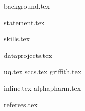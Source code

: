 \documentclass[hidelinks, 12pt]{article}
\begin{document}
{background.tex}

\vspace{1mm}
{statement.tex}

\vspace{1mm}
{skills.tex}

\vspace{1mm}
{dataprojects.tex}

{uq.tex}
\vspace{3mm}
{sccs.tex}
\vspace{3mm}
{griffith.tex}

\vspace{1mm}
{inline.tex}
\vspace{3mm}
{alphapharm.tex}

\vspace{1mm}
{referees.tex}
\end{document}
